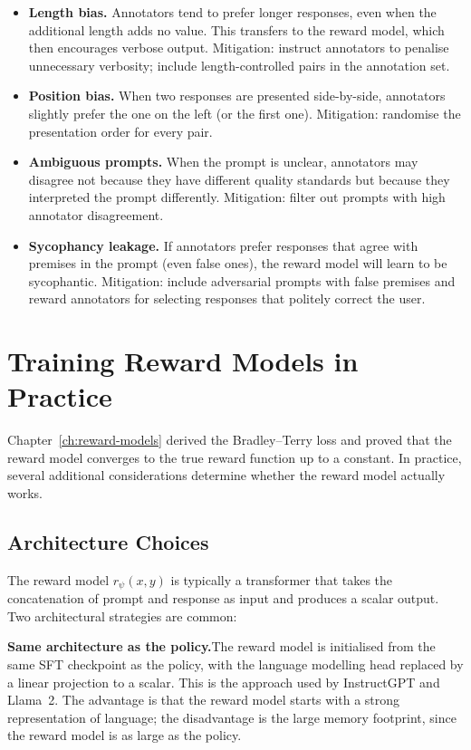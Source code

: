 \begin{itemize}[leftmargin=*]
  \item \textbf{Length bias.} Annotators tend to prefer longer responses, even when the additional length adds no value. This transfers to the reward model, which then encourages verbose output. Mitigation: instruct annotators to penalise unnecessary verbosity; include length-controlled pairs in the annotation set.
  \item \textbf{Position bias.} When two responses are presented side-by-side, annotators slightly prefer the one on the left (or the first one). Mitigation: randomise the presentation order for every pair.
  \item \textbf{Ambiguous prompts.} When the prompt is unclear, annotators may disagree not because they have different quality standards but because they interpreted the prompt differently. Mitigation: filter out prompts with high annotator disagreement.
  \item \textbf{Sycophancy leakage.} If annotators prefer responses that agree with premises in the prompt (even false ones), the reward model will learn to be sycophantic. Mitigation: include adversarial prompts with false premises and reward annotators for selecting responses that politely correct the user.
\end{itemize}

\section{Training Reward Models in Practice}
\label{sec:rm-practice}

Chapter~\ref{ch:reward-models} derived the Bradley--Terry loss and proved that the reward model converges to the true reward function up to a constant. In practice, several additional considerations determine whether the reward model actually works.

\subsection{Architecture Choices}

The reward model $r_\psi(x, y)$ is typically a transformer that takes the concatenation of prompt and response as input and produces a scalar output. Two architectural strategies are common:

\textbf{Same architecture as the policy.}\quad The reward model is initialised from the same SFT checkpoint as the policy, with the language modelling head replaced by a linear projection to a scalar. This is the approach used by InstructGPT and Llama~2. The advantage is that the reward model starts with a strong representation of language; the disadvantage is the large memory footprint, since the reward model is as large as the policy.

